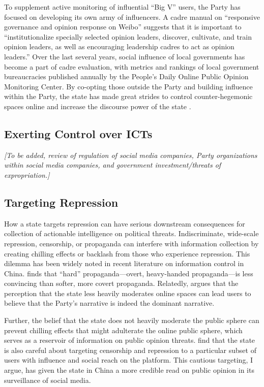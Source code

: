 \documentclass[11pt]{article}
\begin{document}
To supplement active monitoring of influential ``Big V'' users, the Party has focused on developing its own army of influencers. A cadre manual on ``responsive governance and opinion response on Weibo'' suggests that it is important to ``institutionalize specially selected opinion leaders, discover, cultivate, and train opinion leaders, as well as encouraging leadership cadres to act as opinion leaders.'' Over the last several years, social influence of local governments has become a part of cadre evaluation, with metrics and rankings of local government bureaucracies published annually by the People’s Daily Online Public Opinion Monitoring Center. By co-opting those outside the Party and building influence within the Party, the state has made great strides to control counter-hegemonic spaces online and increase the discourse power of the state \citep{gallagher2019who}.

\subsection{Exerting Control over ICTs}

{\it [To be added, review of regulation of social media companies, Party organizations within social media companies, and government investment/threats of expropriation.]}

\subsection{Targeting Repression}

How a state targets repression can have serious downstream consequences for collection of actionable intelligence on political threats. Indiscriminate, wide-scale repression, censorship, or propaganda can interfere with information collection by creating chilling effects or backlash from those who experience repression. This dilemma has been widely noted in recent literature on information control in China. \cite{huang2018pathology} finds that ``hard'' propaganda—overt, heavy-handed propaganda—is less convincing than softer, more covert propaganda. Relatedly, \cite{han2018contesting} argues that the perception that the state less heavily moderates online spaces can lead users to believe that the Party's narrative is indeed the dominant narrative.

Further, the belief that the state does not heavily moderate the public sphere can prevent chilling effects that might adulterate the online public sphere, which serves as a reservoir of information on public opinion threats. \cite{gallagher2021not} find that the state is also careful about targeting censorship and repression to a particular subset of users with influence and social reach on the platform. This cautious targeting, I argue, has given the state in China a more credible read on public opinion in its surveillance of social media. 
\end{document}
